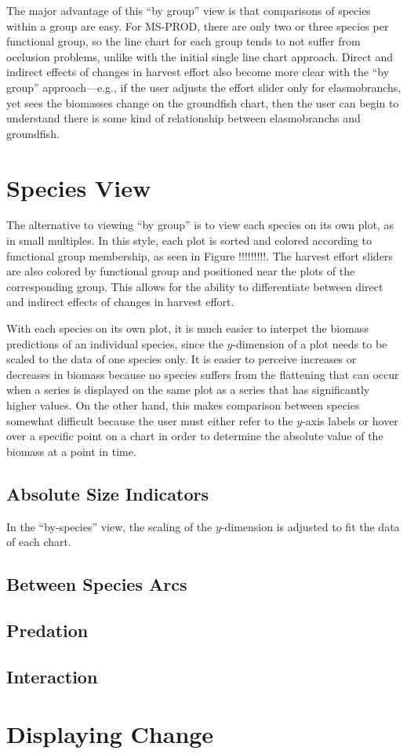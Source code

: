 The major advantage of this ``by group'' view is that comparisons of species within a group are easy.  For MS-PROD, there are only two or three species per functional group, so the line chart for each group tends to not suffer from occlusion problems, unlike with the initial single line chart approach.  Direct and indirect effects of changes in harvest effort also become more clear with the ``by group'' approach---e.g., if the user adjusts the effort slider only for elasmobranchs, yet sees the biomasses change on the groundfish chart, then the user can begin to understand there is some kind of relationship between elasmobranchs and groundfish.

\section{Species View}

The alternative to viewing ``by group'' is to view each species on its own plot, as in small multiples.  In this style, each plot is sorted and colored according to functional group membership, as seen in Figure !!!!!!!!!.  The harvest effort sliders are also colored by functional group and positioned near the plots of the corresponding group.  This allows for the ability to differentiate between direct and indirect effects of changes in harvest effort.

With each species on its own plot, it is much easier to interpet the biomass predictions of an individual species, since the $y$-dimension of a plot needs to be scaled to the data of one species only.  It is easier to perceive increases or decreases in biomass because no species suffers from the flattening that can occur when a series is displayed on the same plot as a series that has significantly higher values.  On the other hand, this makes comparison between species somewhat difficult because the user must either refer to the $y$-axis labels or hover over a specific point on a chart in order to determine the absolute value of the biomass at a point in time.

\subsection{Absolute Size Indicators}

In the ``by-species'' view, the scaling of the $y$-dimension is adjusted to fit the data of each chart.

\subsection{Between Species Arcs}

\subsection{Predation}

\subsection{Interaction}

\section{Displaying Change}

